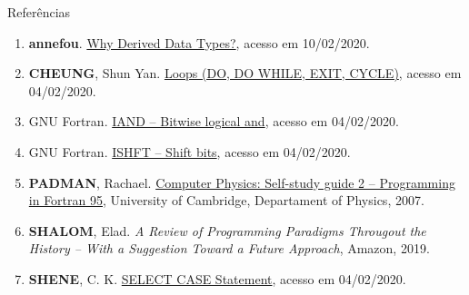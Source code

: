 \begin{frame}[fragile]{Referências}

    \begin{enumerate}

        \item \textbf{annefou}. \href{https://annefou.github.io/Fortran/derivedTypes/derived_types.html}{Why Derived Data Types?}, acesso em 10/02/2020.
 
        \item \textbf{CHEUNG}, Shun Yan. \href{http://www.mathcs.emory.edu/~cheung/Courses/561/Syllabus/5-Fortran/do.html}{Loops (DO, DO WHILE, EXIT, CYCLE)}, acesso em 04/02/2020.

        \item GNU Fortran. \href{https://gcc.gnu.org/onlinedocs/gfortran/IAND.html#IAND}{IAND -- Bitwise logical and}, acesso em 04/02/2020.

        \item GNU Fortran. \href{https://gcc.gnu.org/onlinedocs/gfortran/IAND.html#ISHFT}{ISHFT -- Shift bits}, acesso em 04/02/2020.

        \item \textbf{PADMAN}, Rachael. \href{http://www.mrao.cam.ac.uk/~rachael/compphys/SelfStudyF95.pdf}{Computer Physics: Self-study guide 2 -- Programming in Fortran 95}, University of 
        Cambridge, Departament of Physics, 2007.

        \item \textbf{SHALOM}, Elad. \textit{A Review of Programming Paradigms Througout the 
            History -- With a Suggestion Toward a Future Approach}, Amazon, 2019.

        \item \textbf{SHENE}, C. K. \href{https://pages.mtu.edu/~shene/COURSES/cs201/NOTES/chap03/select.html}{SELECT CASE Statement}, acesso em 04/02/2020. 

 
    \end{enumerate}

\end{frame}
